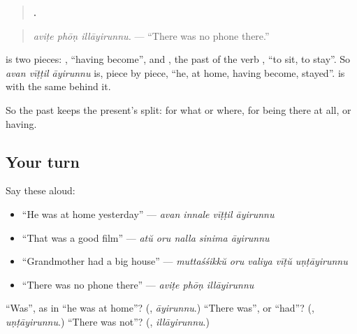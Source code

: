 \begin{quote}
\textbf{  .}
\end{quote}

\begin{quote}
\emph{aviṭe phōṇ illāyirunnu.} — \textquotedblleft{}There was no phone there.\textquotedblright{}
\end{quote}

\begin{grammarlens}[title={Grammar Lens: two pieces you half know}]
\textbf{} is two pieces: \textbf{}, \textquotedblleft{}having become\textquotedblright{}, and \textbf{}, the past of the verb \textbf{}, \textquotedblleft{}to sit, to stay\textquotedblright{}. So \emph{avan vīṭṭil āyirunnu} is, piece by piece, \textquotedblleft{}he, at home, having become, stayed\textquotedblright{}. \textbf{} is \textbf{} with the same \textbf{} behind it.

So the past keeps the present's split: \textbf{} for what or where, \textbf{} for being there at all, or having.
\end{grammarlens}

\subsection*{Your turn}
Say these aloud:

\begin{itemize}
\raggedright
  \item \textquotedblleft{}He was at home yesterday\textquotedblright{} — \emph{avan innale vīṭṭil āyirunnu}
  \item \textquotedblleft{}That was a good film\textquotedblright{} — \emph{atŭ oru nalla sinima āyirunnu}
  \item \textquotedblleft{}Grandmother had a big house\textquotedblright{} — \emph{muttaśśikkŭ oru valiya vīṭŭ uṇṭāyirunnu}
  \item \textquotedblleft{}There was no phone there\textquotedblright{} — \emph{aviṭe phōṇ illāyirunnu}
\end{itemize}

\begin{tcolorbox}[breakable,colback=teal!4,colframe=teal!35!black,title={Before you move on}]
\textquotedblleft{}Was\textquotedblright{}, as in \textquotedblleft{}he was at home\textquotedblright{}? (\textbf{}, \emph{āyirunnu}.) \textquotedblleft{}There was\textquotedblright{}, or \textquotedblleft{}had\textquotedblright{}? (\textbf{}, \emph{uṇṭāyirunnu}.) \textquotedblleft{}There was not\textquotedblright{}? (\textbf{}, \emph{illāyirunnu}.)
\end{tcolorbox}
